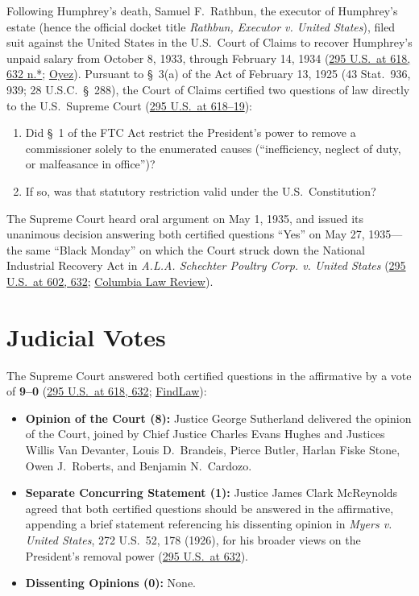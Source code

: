 \documentclass[12pt]{article}
\begin{document}
Following Humphrey's death, Samuel F.\ Rathbun, the executor of Humphrey's estate (hence the official docket title \textit{Rathbun, Executor v. United States}), filed suit against the United States in the U.S.\ Court of Claims to recover Humphrey's unpaid salary from October 8, 1933, through February 14, 1934 (\href{https://supreme.justia.com/cases/federal/us/295/602/}{295 U.S.\ at 618, 632 n.*}; \href{https://www.oyez.org/cases/1900-1940/295us602}{Oyez}). Pursuant to \S\ 3(a) of the Act of February 13, 1925 (43 Stat.\ 936, 939; 28 U.S.C.\ \S\ 288), the Court of Claims certified two questions of law directly to the U.S.\ Supreme Court (\href{https://supreme.justia.com/cases/federal/us/295/602/}{295 U.S.\ at 618--19}):
\begin{enumerate}
    \item Did \S\ 1 of the FTC Act restrict the President's power to remove a commissioner solely to the enumerated causes (``inefficiency, neglect of duty, or malfeasance in office'')?
    \item If so, was that statutory restriction valid under the U.S.\ Constitution?
\end{enumerate}
The Supreme Court heard oral argument on May 1, 1935, and issued its unanimous decision answering both certified questions ``Yes'' on May 27, 1935---the same ``Black Monday'' on which the Court struck down the National Industrial Recovery Act in \textit{A.L.A. Schechter Poultry Corp. v. United States} (\href{https://supreme.justia.com/cases/federal/us/295/602/}{295 U.S.\ at 602, 632}; \href{https://www.columbialawreview.org/content/quasi-judicial-a-history-and-tradition/}{Columbia Law Review}).

\section{Judicial Votes}

The Supreme Court answered both certified questions in the affirmative by a vote of \textbf{9--0} (\href{https://supreme.justia.com/cases/federal/us/295/602/}{295 U.S.\ at 618, 632}; \href{https://caselaw.findlaw.com/court/us-supreme-court/295/602.html}{FindLaw}):
\begin{itemize}
    \item \textbf{Opinion of the Court (8):} Justice George Sutherland delivered the opinion of the Court, joined by Chief Justice Charles Evans Hughes and Justices Willis Van Devanter, Louis D.\ Brandeis, Pierce Butler, Harlan Fiske Stone, Owen J.\ Roberts, and Benjamin N.\ Cardozo.
    \item \textbf{Separate Concurring Statement (1):} Justice James Clark McReynolds agreed that both certified questions should be answered in the affirmative, appending a brief statement referencing his dissenting opinion in \textit{Myers v. United States}, 272 U.S.\ 52, 178 (1926), for his broader views on the President's removal power (\href{https://caselaw.findlaw.com/court/us-supreme-court/295/602.html}{295 U.S.\ at 632}).
    \item \textbf{Dissenting Opinions (0):} None.
\end{itemize}
\end{document}
